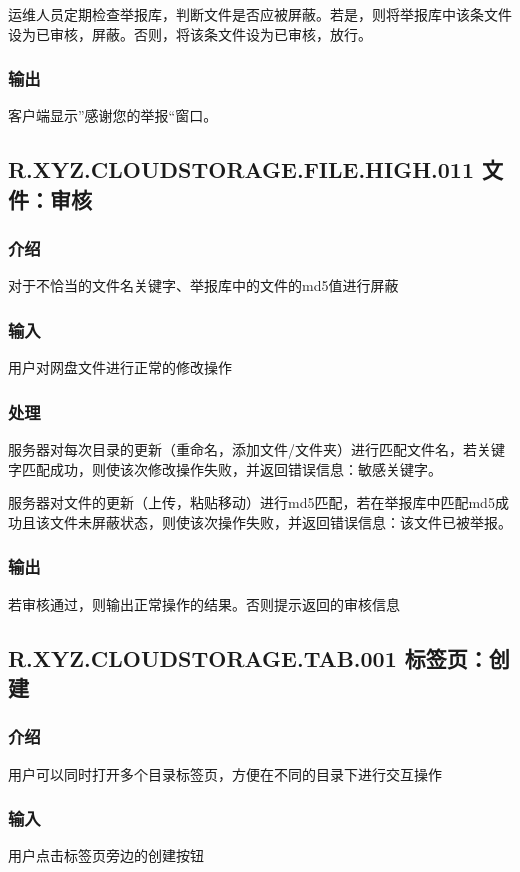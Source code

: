 运维人员定期检查举报库，判断文件是否应被屏蔽。若是，则将举报库中该条文件设为已审核，屏蔽。否则，将该条文件设为已审核，放行。

\subsubsection{输出} 
客户端显示”感谢您的举报“窗口。


\subsection{R.XYZ.CLOUDSTORAGE.FILE.HIGH.011 文件：审核}

\subsubsection{介绍}
对于不恰当的文件名关键字、举报库中的文件的md5值进行屏蔽

\subsubsection{输入} 
用户对网盘文件进行正常的修改操作

\subsubsection{处理} 
服务器对每次目录的更新（重命名，添加文件/文件夹）进行匹配文件名，若关键字匹配成功，则使该次修改操作失败，并返回错误信息：敏感关键字。

服务器对文件的更新（上传，粘贴移动）进行md5匹配，若在举报库中匹配md5成功且该文件未屏蔽状态，则使该次操作失败，并返回错误信息：该文件已被举报。

\subsubsection{输出} 
若审核通过，则输出正常操作的结果。否则提示返回的审核信息

\subsection{R.XYZ.CLOUDSTORAGE.TAB.001 标签页：创建}

\subsubsection{介绍}
用户可以同时打开多个目录标签页，方便在不同的目录下进行交互操作
\subsubsection{输入} 
用户点击标签页旁边的创建按钮
